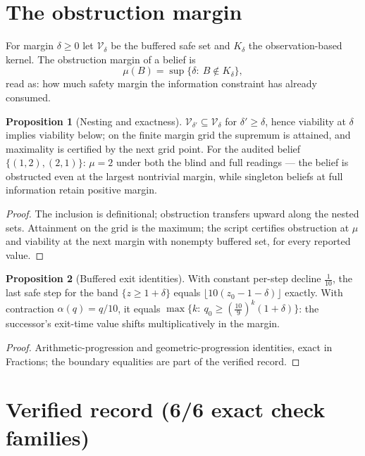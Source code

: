 \documentclass[10pt,twocolumn]{article}
\theoremstyle{definition}
\newtheorem{proposition}{Proposition}
\begin{document}
\section{The obstruction margin}

For margin $\delta\ge0$ let $\mathcal V_\delta$ be the buffered safe set
and $K_\delta$ the observation-based kernel. The obstruction margin of a
belief is
\begin{equation*}
\mu(B)=\sup\{\delta:\ B\notin K_\delta\},
\end{equation*}
read as: how much safety margin the information constraint has already
consumed.

\begin{proposition}[Nesting and exactness]
\label{prop:nest}
$\mathcal V_{\delta'}\subseteq\mathcal V_\delta$ for $\delta'\ge\delta$,
hence viability at $\delta$ implies viability below; on the finite margin
grid the supremum is attained, and maximality is certified by the next
grid point. For the audited belief $\{(1,2),(2,1)\}$: $\mu=2$ under both
the blind and full readings --- the belief is obstructed even at the
largest nontrivial margin, while singleton beliefs at full information
retain positive margin.
\end{proposition}
\begin{proof}
The inclusion is definitional; obstruction transfers upward along the
nested sets. Attainment on the grid is the maximum; the script certifies
obstruction at $\mu$ and viability at the next margin with nonempty
buffered set, for every reported value.
\end{proof}

\begin{proposition}[Buffered exit identities]
With constant per-step decline $\tfrac1{10}$, the last safe step for the
band $\{z\ge1+\delta\}$ equals $\lfloor10(z_0-1-\delta)\rfloor$ exactly.
With contraction $\alpha(q)=q/10$, it equals
$\max\{k:\ q_0\ge(\tfrac{10}9)^k(1+\delta)\}$: the successor's exit-time
value shifts multiplicatively in the margin.
\end{proposition}
\begin{proof}
Arithmetic-progression and geometric-progression identities, exact in
Fractions; the boundary equalities are part of the verified record.
\end{proof}

\section{Verified record (6/6 exact check families)}
\end{document}
